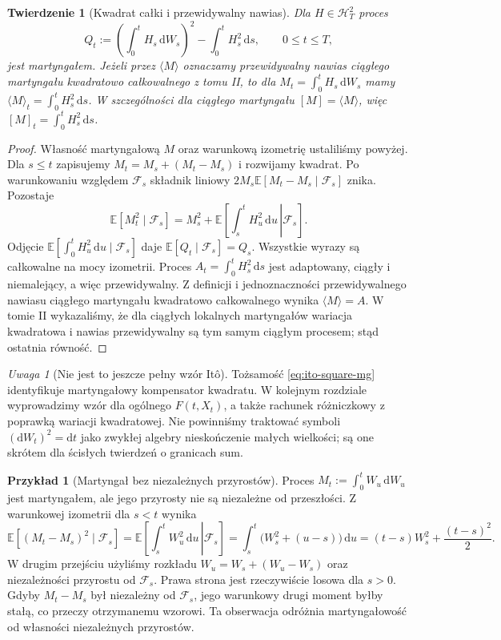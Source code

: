 \documentclass[11pt,a4paper,oneside]{report}
\numberwithin{equation}{chapter}
\theoremstyle{plain}
\newtheorem{twierdzenie}{Twierdzenie}[chapter]
\theoremstyle{definition}
\newtheorem{przyklad}{Przykład}[chapter]
\theoremstyle{remark}
\newtheorem{uwaga}{Uwaga}[chapter]
\newcommand{\E}{\mathbb{E}}
\newcommand{\calF}{\mathcal{F}}
\newcommand{\calH}{\mathcal{H}}
\newcommand{\dd}{\mathrm{d}}
\begin{document}
\begin{twierdzenie}[Kwadrat całki i przewidywalny nawias]\label{thm:volIII:02:04}
\label{th:ito-bracket}
Dla $H\in\calH_T^2$ proces
\[
Q_t:=\left(\int_0^tH_s\,\dd W_s\right)^2
-\int_0^tH_s^2\,\dd s,\qquad 0\le t\le T,
\tag{2.10}\label{eq:ito-square-mg}
\]
jest martyngałem. Jeżeli przez $\langle M\rangle$
oznaczamy przewidywalny nawias ciągłego martyngału
kwadratowo całkowalnego z tomu II, to dla
$M_t=\int_0^tH_s\,\dd W_s$ mamy
$\langle M\rangle_t=\int_0^tH_s^2\,\dd s$.
W szczególności dla ciągłego martyngału
$[M]=\langle M\rangle$, więc
$[M]_t=\int_0^tH_s^2\,\dd s$.
\end{twierdzenie}
\begin{proof}
Własność martyngałową $M$ oraz warunkową izometrię
ustaliliśmy powyżej. Dla $s\le t$ zapisujemy
$M_t=M_s+(M_t-M_s)$ i rozwijamy kwadrat.
Po warunkowaniu względem $\calF_s$ składnik liniowy
$2M_s\E[M_t-M_s\mid\calF_s]$ znika. Pozostaje
\[
\E[M_t^2\mid\calF_s]
=M_s^2+\E\left[\left.\int_s^tH_u^2\,\dd u\,\right|\calF_s\right].
\]
Odjęcie $\E[\int_0^tH_u^2\,\dd u\mid\calF_s]$
daje $\E[Q_t\mid\calF_s]=Q_s$. Wszystkie wyrazy
są całkowalne na mocy izometrii.
Proces $A_t=\int_0^tH_s^2\,\dd s$ jest adaptowany,
ciągły i niemalejący, a więc przewidywalny.
Z definicji i jednoznaczności przewidywalnego nawiasu
ciągłego martyngału kwadratowo całkowalnego wynika
$\langle M\rangle=A$. W tomie II wykazaliśmy,
że dla ciągłych lokalnych martyngałów wariacja
kwadratowa i nawias przewidywalny są tym samym
ciągłym procesem; stąd ostatnia równość.
\end{proof}

\begin{uwaga}[Nie jest to jeszcze pełny wzór Itô]
Tożsamość \eqref{eq:ito-square-mg} identyfikuje
martyngałowy kompensator kwadratu. W kolejnym rozdziale
wyprowadzimy wzór dla ogólnego $F(t,X_t)$, a także
rachunek różniczkowy z poprawką wariacji kwadratowej.
Nie powinniśmy traktować symboli $(\dd W_t)^2=\dd t$
jako zwykłej algebry nieskończenie małych wielkości;
są one skrótem dla ścisłych twierdzeń o granicach sum.
\end{uwaga}


\begin{przyklad}[Martyngał bez niezależnych przyrostów]
Proces $M_t:=\int_0^tW_u\,\dd W_u$
jest martyngałem, ale jego przyrosty nie są niezależne
od przeszłości. Z warunkowej izometrii dla $s<t$
wynika
\[
\E[(M_t-M_s)^2\mid\calF_s]
=\E\left[\left.\int_s^tW_u^2\,\dd u\,\right|\calF_s\right]
=\int_s^t\big(W_s^2+(u-s)\big)\,\dd u
=(t-s)W_s^2+\frac{(t-s)^2}{2}.
\]
W drugim przejściu użyliśmy rozkładu
$W_u=W_s+(W_u-W_s)$ oraz niezależności
przyrostu od $\calF_s$. Prawa strona jest
rzeczywiście losowa dla $s>0$. Gdyby
$M_t-M_s$ był niezależny od $\calF_s$, jego
warunkowy drugi moment byłby stałą, co przeczy
otrzymanemu wzorowi. Ta obserwacja odróżnia
martyngałowość od własności niezależnych przyrostów.
\end{przyklad}
\end{document}
